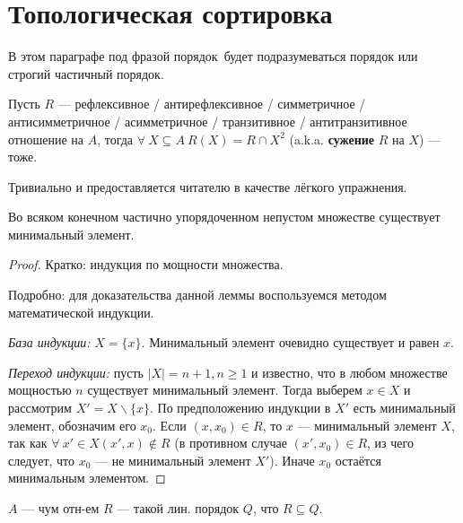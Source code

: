 \section{Топологическая сортировка}\label{sec:ch-2-sec-5}

В этом параграфе под фразой  порядок\guillemotright ~будет подразумеваться  порядок или строгий частичный порядок\guillemotright.

\begin{lemma}
    Пусть $R$ --- рефлексивное / антирефлексивное / симметричное / антисимметричное / асимметричное / транзитивное / антитранзитивное отношение на $A$, тогда $\forall ~X \subseteq A ~R(X)=R\cap X^2$ (a.k.a. \textbf{сужение} $R$ на $X$) --- тоже.
\end{lemma}

\begin{sh-proof}
    Тривиально и предоставляется читателю в качестве лёгкого упражнения.
\end{sh-proof}

\begin{lemma}
    Во всяком конечном частично упорядоченном непустом множестве существует минимальный элемент.
\end{lemma}

\begin{proof}
    Кратко: индукция по мощности множества.

    Подробно: для доказательства данной леммы воспользуемся методом математической индукции.

    \textit{База индукции:} $X = \{x\}$. Минимальный элемент очевидно существует и равен $x$.

    \textit{Переход индукции:} пусть $|X| = n + 1, n \geq 1$ и известно, что в любом множестве мощностью $n$ существует минимальный элемент.
    Тогда выберем $x \in X$ и рассмотрим $X' = X \backslash \{x\}$.
    По предположению индукции в $X'$ есть минимальный элемент, обозначим его $x_0$.
    Если $(x, x_0) \in R$, то $x$ --- минимальный элемент $X$, так как $\forall ~x' \in X (x', x) \notin R$ (в противном случае $(x', x_0) \in R$, из чего следует, что $x_0$ --- не минимальный элемент $X'$).
    Иначе $x_0$ остаётся минимальным элементом.
\end{proof}

\begin{sh-definition} 
    $A$ --- чум отн-ем $R$ --- такой лин. порядок $Q$, что $R \subseteq Q$.
\end{sh-definition}

